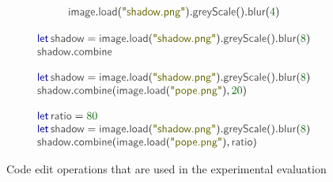 \documentclass[acmsmall,anonymous,fleqn]{acmart}\settopmatter{printfolios=false,printccs=false,printacmref=false}
\theoremstyle{plain}
\theoremstyle{definition}
\newcommand{\num}[1]{\textcolor{numclr}{#1}}
\newcommand{\str}[1]{\textnormal{\textcolor{strclr}{\sffamily "#1"}}}
\newcommand{\ident}[1]{\textnormal{\textcolor{idclr}{\sffamily #1}}}
\newcommand{\kvd}[1]{\textnormal{\textcolor{kvdclr}{\sffamily #1}}}
\begin{document}

\begin{figure}
\raggedright

\vspace{0.5em}\hspace{1.5em}{\small\sffamily (1) Enter the following code and then change parameter of blur from 4 to 8:}
\begin{equation*}
\begin{array}{l}
\ident{image}.\ident{load}(\str{shadow.png}).\ident{greyScale}().\ident{blur}(\num{4})
\end{array}
\end{equation*}

\vspace{0.5em}\hspace{1.5em}{\small\sffamily (2) Assign the result to a variable and start writing code for further operations:}
\begin{equation*}
\begin{array}{l}
\kvd{let}\,\ident{shadow}=\ident{image}.\ident{load}(\str{shadow.png}).\ident{greyScale}().\ident{blur}(\num{8})\\
\ident{shadow}.\ident{combine}
\end{array}
\end{equation*}

\vspace{0.5em}\hspace{1.5em}{\small\sffamily (3) Finish code to combine two images and then change parameter of combine from 20 to 80:}
\begin{equation*}
\begin{array}{l}
\kvd{let}\,\ident{shadow}=\ident{image}.\ident{load}(\str{shadow.png}).\ident{greyScale}().\ident{blur}(\num{8})\\
\ident{shadow}.\ident{combine}(\ident{image}.\ident{load}(\str{pope.png}), \num{20})
\end{array}
\end{equation*}

\vspace{0.5em}\hspace{1.5em}{\small\sffamily (4) Extract the parameter of combine to a let bound variable:}
\begin{equation*}
\begin{array}{l}
\kvd{let}\,\ident{ratio} = \num{80} \\
\kvd{let}\,\ident{shadow}=\ident{image}.\ident{load}(\str{shadow.png}).\ident{greyScale}().\ident{blur}(\num{8})\\
\ident{shadow}.\ident{combine}(\ident{image}.\ident{load}(\str{pope.png}), \ident{ratio})
\end{array}
\end{equation*}

\caption{Code edit operations that are used in the experimental evaluation}
\label{fig:image-edits}
\end{figure}
\end{document}
